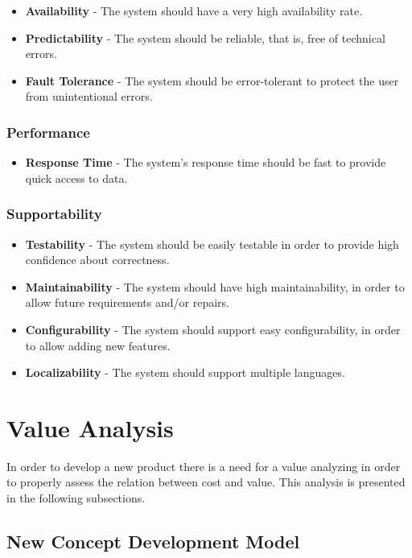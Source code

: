 \begin{itemize}
    \item \textbf{Availability} - The system should have a very high availability rate.
    \item \textbf{Predictability} - The system should be reliable, that is, free of technical errors.
    \item \textbf{Fault Tolerance} - The system should be error-tolerant to protect the user from unintentional errors.
\end{itemize}

\subsubsection{Performance}

\begin{itemize}
    \item \textbf{Response Time} - The system's response time should be fast to provide quick access to data.
\end{itemize}

\subsubsection{Supportability}

\begin{itemize}
    \item \textbf{Testability} - The system should be easily testable in order to provide high confidence about correctness.
    \item \textbf{Maintainability} - The system should have high maintainability, in order to allow future requirements and/or repairs.
    \item \textbf{Configurability} - The system should support easy configurability, in order to allow adding new features.
    \item \textbf{Localizability} - The system should support multiple languages.
\end{itemize}

\section{Value Analysis}

In order to develop a new product there is a need for a value analyzing in order to properly assess the relation between cost and value.
This analysis is presented in the following subsections.

\subsection{New Concept Development Model}

